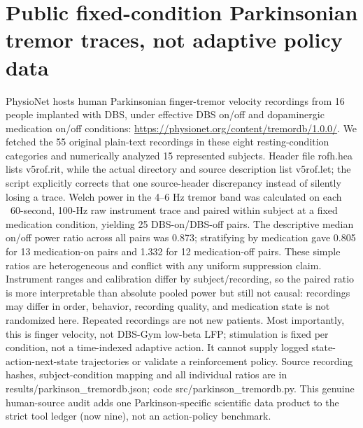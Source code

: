 \section{Public fixed-condition Parkinsonian tremor traces, not adaptive policy data}
PhysioNet hosts human Parkinsonian finger-tremor velocity recordings from 16 people implanted with DBS, under effective DBS on/off and dopaminergic medication on/off conditions: \url{https://physionet.org/content/tremordb/1.0.0/}. We fetched the 55 original plain-text recordings in these eight resting-condition categories and numerically analyzed 15 represented subjects. Header file rofh.hea lists v5rof.rit, while the actual directory and source description list v5rof.let; the script explicitly corrects that one source-header discrepancy instead of silently losing a trace. Welch power in the 4--6 Hz tremor band was calculated on each ~60-second, 100-Hz raw instrument trace and paired within subject at a fixed medication condition, yielding 25 DBS-on/DBS-off pairs. The descriptive median on/off power ratio across all pairs was 0.873; stratifying by medication gave 0.805 for 13 medication-on pairs and 1.332 for 12 medication-off pairs. These simple ratios are heterogeneous and conflict with any uniform suppression claim. Instrument ranges and calibration differ by subject/recording, so the paired ratio is more interpretable than absolute pooled power but still not causal: recordings may differ in order, behavior, recording quality, and medication state is not randomized here. Repeated recordings are not new patients. Most importantly, this is finger velocity, not DBS-Gym low-beta LFP; stimulation is fixed per condition, not a time-indexed adaptive action. It cannot supply logged state-action-next-state trajectories or validate a reinforcement policy. Source recording hashes, subject-condition mapping and all individual ratios are in results/parkinson\_tremordb.json; code src/parkinson\_tremordb.py. This genuine human-source audit adds one Parkinson-specific scientific data product to the strict tool ledger (now nine), not an action-policy benchmark.

